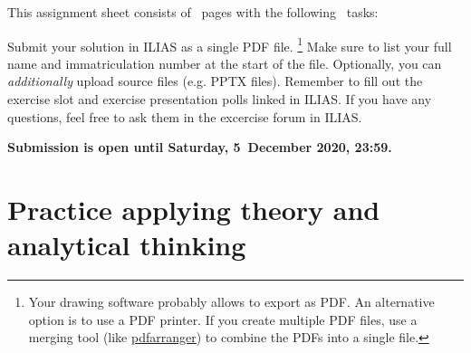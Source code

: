 \documentclass[solution]{acAssignment}
\begin{document}
\maketitle

This assignment sheet consists of \acNumPages~pages with the following \acNumTasks~tasks:

\acListOfTasks

Submit your solution in ILIAS as a single PDF file.%
\footnote{Your drawing software probably allows to export as PDF.
    An alternative option is to use a PDF printer.
    If you create multiple PDF files, use a merging tool (like \href{https://github.com/pdfarranger/pdfarranger}{pdfarranger}) to combine the PDFs into a single file.}
Make sure to list your full name and immatriculation number at the start of the file.
Optionally, you can \emph{additionally} upload source files (e.g. PPTX files).
Remember to fill out the exercise slot and exercise presentation polls linked in ILIAS.
If you have any questions, feel free to ask them in the excercise forum in ILIAS.

\textbf{Submission is open until Saturday, 5~December 2020, 23:59.}

\section{Practice applying theory and analytical thinking}
\end{document}
